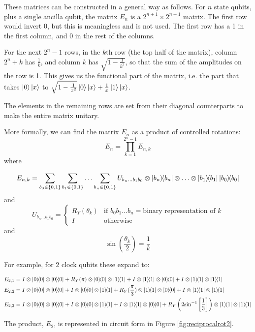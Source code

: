 \documentclass[12pt]{extarticle}
\begin{document}
These matrices can be constructed in a general way as follows.
For $n$ state qubits, plus a single ancilla qubit, the matrix $E_n$ is a $2^{n+1} \times 2^{n+1}$ matrix.
The first row would invert 0, but this is meaningless and is not used. The first row has a 1 in the first column, and 0 in the rest of the columns.

For the next $2^n-1$ rows, in the $k$th row (the top half of the matrix), column $2^n+k$ has $\frac{1}{k}$, and column $k$ has $\sqrt{1-\frac{1}{k^2}}$, so that the sum of the amplitudes on the row is 1.
This gives us the functional part of the matrix, i.e. the part that takes $\ket{0}\ket{x}$ to $\sqrt{1-\frac{1}{x^2}}\ket{0}\ket{x} + \frac{1}{x}\ket{1}\ket{x}$.

The elements in the remaining rows are set from their diagonal counterparts to make the entire matrix unitary.

More formally, we can find the matrix $E_n$ as a product of controlled rotations:
\[
E_n = \prod_{k=1}^{2^n-1} E_{n,k}
\]
where

\[
E_{n,k} =
\sum_{b_0\in\{0,1\}} \sum_{b_1\in\{0,1\}} \ldots \sum_{b_n\in\{0,1\}} U_{b_n\ldots b_1b_0} \otimes \outerproduct{b_n} \otimes \ldots \otimes \outerproduct{b_1} \outerproduct{b_0}
\]
and
\[
U_{b_n\ldots b_1b_0} = \begin{cases}
    R_Y(\theta_k) & \text{if } b_0b_1\ldots b_n = \text{binary representation of } k \\
    I & \text{otherwise}
\end{cases}
\]
and
\[
\sin\left(\frac{\theta_k}{2}\right) = \frac{1}{k}
\]

For example, for 2 clock qubits these expand to:
\begin{footnotesize}
\begin{align*}
E_{2,1} &= I \otimes \outerproduct{0} \otimes \outerproduct{0}
         + R_Y(\pi) \otimes \outerproduct{0} \otimes \outerproduct{1}
         + I \otimes \outerproduct{1} \otimes \outerproduct{0}
         + I \otimes \outerproduct{1} \otimes \outerproduct{1} \\
E_{2,2} &= I \otimes \outerproduct{0} \otimes \outerproduct{0}
         + I \otimes \outerproduct{0} \otimes \outerproduct{1}
         + R_Y(\frac{\pi}{3}) \otimes \outerproduct{1} \otimes \outerproduct{0}
         + I \otimes \outerproduct{1} \otimes \outerproduct{1} \\
E_{2,3} &= I \otimes \outerproduct{0} \otimes \outerproduct{0}
            + I \otimes \outerproduct{0} \otimes \outerproduct{1}
            + I \otimes \outerproduct{1} \otimes \outerproduct{0}
            + R_Y\left(2\inv{\sin}\left[\frac{1}{3}\right]\right) \otimes \outerproduct{1} \otimes \outerproduct{1} \\
\end{align*}
\end{footnotesize}
The product, $E_2$, is represented in circuit form in Figure \ref{fig:reciprocalrot2}.
\end{document}
